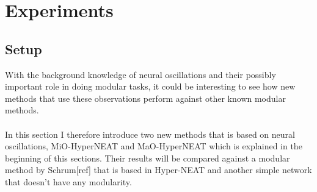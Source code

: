 \documentclass[11pt, a4paper]{article}
\begin{document}
\author{Mads Anthony}
\section{Experiments}
\subsection{Setup}
With the background knowledge of neural oscillations and their possibly important role in doing modular tasks, it could be interesting to see how new methods that use these observations perform against other known modular methods.
\\
\\
In this section I therefore introduce two new methods that is based on neural oscillations, MiO-HyperNEAT and MaO-HyperNEAT which is explained in the beginning of this sections. Their results will be compared against a modular method by Schrum[ref] that is based in Hyper-NEAT and another simple network that doesn't have any modularity.
\end{document}
